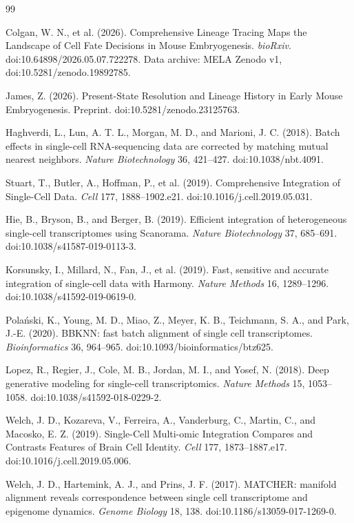\documentclass[11pt]{article}
\begin{document}
\begin{thebibliography}{99}

Colgan, W. N., et al. (2026).
Comprehensive Lineage Tracing Maps the Landscape of Cell Fate Decisions in Mouse Embryogenesis.
\emph{bioRxiv}.
doi:10.64898/2026.05.07.722278.
Data archive: MELA Zenodo v1, doi:10.5281/zenodo.19892785.

James, Z. (2026).
Present-State Resolution and Lineage History in Early Mouse Embryogenesis.
Preprint.
doi:10.5281/zenodo.23125763.

Haghverdi, L., Lun, A. T. L., Morgan, M. D., and Marioni, J. C. (2018).
Batch effects in single-cell RNA-sequencing data are corrected by matching mutual nearest neighbors.
\emph{Nature Biotechnology} 36, 421--427.
doi:10.1038/nbt.4091.

Stuart, T., Butler, A., Hoffman, P., et al. (2019).
Comprehensive Integration of Single-Cell Data.
\emph{Cell} 177, 1888--1902.e21.
doi:10.1016/j.cell.2019.05.031.

Hie, B., Bryson, B., and Berger, B. (2019).
Efficient integration of heterogeneous single-cell transcriptomes using Scanorama.
\emph{Nature Biotechnology} 37, 685--691.
doi:10.1038/s41587-019-0113-3.

Korsunsky, I., Millard, N., Fan, J., et al. (2019).
Fast, sensitive and accurate integration of single-cell data with Harmony.
\emph{Nature Methods} 16, 1289--1296.
doi:10.1038/s41592-019-0619-0.

Pola\'nski, K., Young, M. D., Miao, Z., Meyer, K. B., Teichmann, S. A., and Park, J.-E. (2020).
BBKNN: fast batch alignment of single cell transcriptomes.
\emph{Bioinformatics} 36, 964--965.
doi:10.1093/bioinformatics/btz625.

Lopez, R., Regier, J., Cole, M. B., Jordan, M. I., and Yosef, N. (2018).
Deep generative modeling for single-cell transcriptomics.
\emph{Nature Methods} 15, 1053--1058.
doi:10.1038/s41592-018-0229-2.

Welch, J. D., Kozareva, V., Ferreira, A., Vanderburg, C., Martin, C., and Macosko, E. Z. (2019).
Single-Cell Multi-omic Integration Compares and Contrasts Features of Brain Cell Identity.
\emph{Cell} 177, 1873--1887.e17.
doi:10.1016/j.cell.2019.05.006.

Welch, J. D., Hartemink, A. J., and Prins, J. F. (2017).
MATCHER: manifold alignment reveals correspondence between single cell transcriptome and epigenome dynamics.
\emph{Genome Biology} 18, 138.
doi:10.1186/s13059-017-1269-0.


\end{thebibliography}
\end{document}
